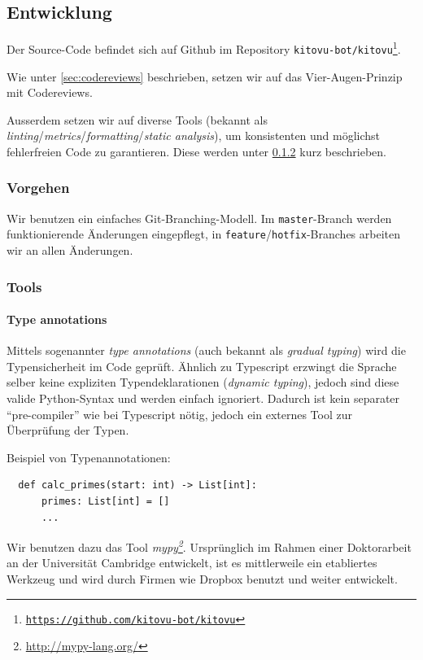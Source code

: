 \documentclass[a4paper]{article}
\newcommand{\tool}[2]{\emph{#1\footnote{\url{#2}}}}
\begin{document}
\subsection{Entwicklung}

Der Source-Code befindet sich auf Github im Repository \texttt{kitovu-bot/kitovu\footnote{\url{https://github.com/kitovu-bot/kitovu}}}.

Wie unter \ref{sec:codereviews} beschrieben, setzen wir auf das
Vier-Augen-Prinzip mit Codereviews.

Ausserdem setzen wir auf diverse Tools (bekannt als
\emph{linting}/\emph{metrics}/\emph{formatting}/\emph{static analysis}), um konsistenten und möglichst
fehlerfreien Code zu garantieren. Diese werden unter \ref{sec:tools} kurz beschrieben.

\subsubsection{Vorgehen}
Wir benutzen ein einfaches Git-Branching-Modell. Im \verb|master|-Branch
werden funktionierende Änderungen eingepflegt, in \verb|feature|/\verb|hotfix|-Branches arbeiten wir an allen Änderungen.

\subsubsection{Tools}
\label{sec:tools}

\paragraph{Type annotations} Mittels sogenannter \emph{type annotations} (auch bekannt als \emph{gradual typing}) wird die Typensicherheit im Code geprüft. Ähnlich zu Typescript erzwingt die Sprache selber keine expliziten
Typendeklarationen (\emph{dynamic typing}), jedoch sind diese valide Python-Syntax und werden einfach ignoriert. Dadurch ist kein separater ``pre-compiler'' wie bei Typescript nötig, jedoch ein externes Tool zur Überprüfung der Typen.

Beispiel von Typenannotationen:

\begin{verbatim}
  def calc_primes(start: int) -> List[int]:
      primes: List[int] = []
      ...
\end{verbatim}

Wir benutzen dazu das Tool \tool{mypy}{http://mypy-lang.org/}.
Ursprünglich im Rahmen einer Doktorarbeit an der Universität Cambridge
entwickelt, ist es mittlerweile ein etabliertes Werkzeug und wird durch Firmen wie Dropbox benutzt und weiter entwickelt.
\end{document}
